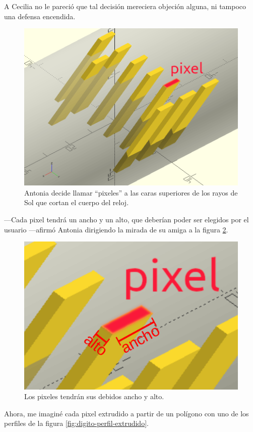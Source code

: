 A Cecilia no le pareció que tal decisión mereciera objeción alguna, ni
tampoco una defensa encendida.

\begin{figure}[ht]
  \centering
  \includegraphics[width=.5\textwidth]{imagenes/digito-soslayo-pixel}
  \caption{Antonia decide llamar ``pixeles'' a las caras superiores de
    los rayos de Sol que cortan el cuerpo del reloj.}
  \label{fig:digito-soslayo-pixel}
\end{figure}

---Cada pixel tendrá un ancho y un alto, que deberían poder ser
elegidos por el usuario ---afirmó Antonia dirigiendo la mirada de su
amiga a la figura \ref{fig:pixel-alto-ancho}.


\begin{figure}[ht]
  \centering
  \includegraphics[width=.5\textwidth]{imagenes/pixel-alto-ancho}  
  \caption{Los pixeles tendrán sus debidos ancho y alto.}
  \label{fig:pixel-alto-ancho}
\end{figure}


\guillemotright Ahora, me imaginé cada pixel extrudido a partir de un
polígono con uno de los perfiles de la figura
\ref{fig:digito-perfil-extrudido}.

